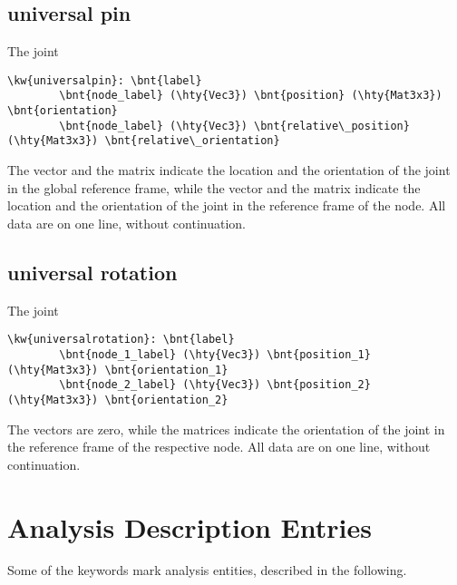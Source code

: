 \subsection{universal pin}
The  joint
\begin{Verbatim}[commandchars=\\\{\}]
    \kw{universalpin}: \bnt{label}
        \bnt{node_label} (\hty{Vec3}) \bnt{position} (\hty{Mat3x3}) \bnt{orientation}
        \bnt{node_label} (\hty{Vec3}) \bnt{relative\_position} (\hty{Mat3x3}) \bnt{relative\_orientation}
\end{Verbatim}
The  vector and the  matrix indicate 
the location and the orientation of the joint in the global reference frame, 
while the  vector
and the  matrix indicate
the location and the orientation of the joint
in the reference frame of the node.
All data are on one line, without continuation.

\subsection{universal rotation}
The  joint
\begin{Verbatim}[commandchars=\\\{\}]
    \kw{universalrotation}: \bnt{label}
        \bnt{node_1_label} (\hty{Vec3}) \bnt{position_1} (\hty{Mat3x3}) \bnt{orientation_1}
        \bnt{node_2_label} (\hty{Vec3}) \bnt{position_2} (\hty{Mat3x3}) \bnt{orientation_2}
\end{Verbatim}
The  vectors are zero,
while the  matrices indicate the orientation of the joint
in the reference frame of the respective node.
All data are on one line, without continuation.


\section{Analysis Description Entries}
Some of the keywords mark analysis entities, described in the following.

